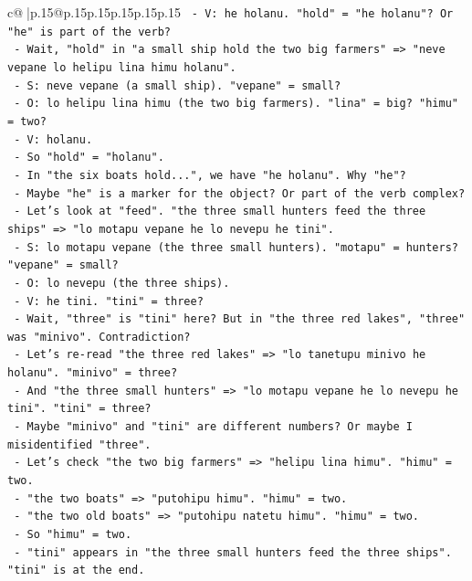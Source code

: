 \documentclass{article}
\begin{document}
{\begin{supertabular}{c@{$\;$}|p{.15\linewidth}@{}p{.15\linewidth}p{.15\linewidth}p{.15\linewidth}p{.15\linewidth}p{.15\linewidth}}
{{{\texttt{     {-} V: he holanu. "hold" = "he holanu"? Or "he" is part of the verb?} \\
\texttt{     {-} Wait, "hold" in "a small ship hold the two big farmers" => "neve vepane lo helipu lina himu holanu".} \\
\texttt{       {-} S: neve vepane (a small ship). "vepane" = small?} \\
\texttt{       {-} O: lo helipu lina himu (the two big farmers). "lina" = big? "himu" = two?} \\
\texttt{       {-} V: holanu.} \\
\texttt{     {-} So "hold" = "holanu".} \\
\texttt{     {-} In "the six boats hold...", we have "he holanu". Why "he"?} \\
\texttt{     {-} Maybe "he" is a marker for the object? Or part of the verb complex?} \\
\texttt{     {-} Let's look at "feed". "the three small hunters feed the three ships" => "lo motapu vepane he lo nevepu he tini".} \\
\texttt{       {-} S: lo motapu vepane (the three small hunters). "motapu" = hunters? "vepane" = small?} \\
\texttt{       {-} O: lo nevepu (the three ships).} \\
\texttt{       {-} V: he tini. "tini" = three?} \\
\texttt{       {-} Wait, "three" is "tini" here? But in "the three red lakes", "three" was "minivo". Contradiction?} \\
\texttt{       {-} Let's re{-}read "the three red lakes" => "lo tanetupu minivo he holanu". "minivo" = three?} \\
\texttt{       {-} And "the three small hunters" => "lo motapu vepane he lo nevepu he tini". "tini" = three?} \\
\texttt{       {-} Maybe "minivo" and "tini" are different numbers? Or maybe I misidentified "three".} \\
\texttt{       {-} Let's check "the two big farmers" => "helipu lina himu". "himu" = two.} \\
\texttt{       {-} "the two boats" => "putohipu himu". "himu" = two.} \\
\texttt{       {-} "the two old boats" => "putohipu natetu himu". "himu" = two.} \\
\texttt{       {-} So "himu" = two.} \\
\texttt{       {-} "tini" appears in "the three small hunters feed the three ships". "tini" is at the end.} \\
}}}
\end{supertabular}}
\end{document}
